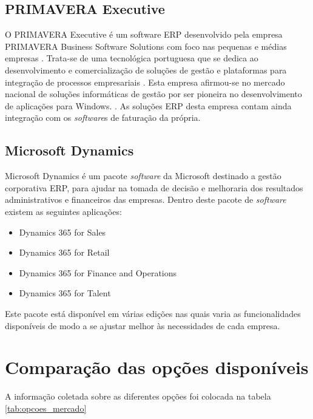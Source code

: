 \subsection{PRIMAVERA Executive}
O PRIMAVERA Executive é um software ERP desenvolvido pela empresa PRIMAVERA Business Software Solutions com foco nas pequenas e médias empresas \cite{PRIMAVERABSS}. Trata-se de uma tecnológica portuguesa que se dedica ao desenvolvimento e comercialização de soluções de gestão e plataformas para integração de processos empresariais \cite{Wikipediaa}. Esta empresa afirmou-se no mercado nacional de soluções informáticas de gestão por ser pioneira no desenvolvimento de aplicações para Windows. \cite{Wikipediaa}.
As soluções ERP desta empresa contam ainda integração com os \textit{software}s de faturação da própria.

\subsection{Microsoft Dynamics}
Microsoft Dynamics é um pacote \textit{software} da Microsoft destinado a gestão corporativa ERP, para ajudar na tomada de decisão e melhoraria dos resultados administrativos e financeiros das empresas\cite{Wikipediac}.
Dentro deste pacote de \textit{software} existem as seguintes aplicações:
\begin{itemize}
	\item Dynamics 365 for Sales
	\item Dynamics 365 for Retail
	\item Dynamics 365 for Finance and Operations
	\item Dynamics 365 for Talent
\end{itemize}
Este pacote está disponível em várias edições nas quais varia as funcionalidades disponíveis de modo a se ajustar melhor às necessidades de cada empresa.
\section{Comparação das opções disponíveis}
A informação coletada sobre as diferentes opções foi colocada na tabela \ref{tab:opcoes_mercado}

